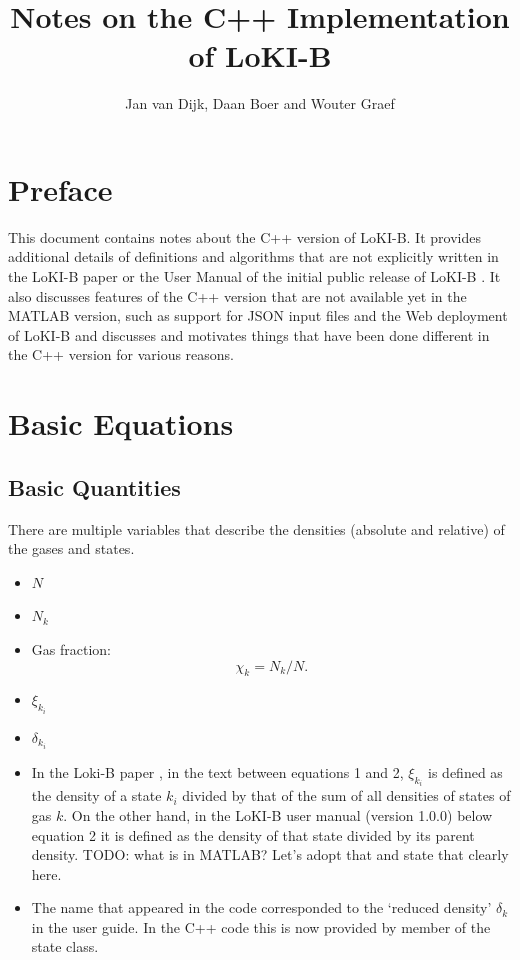 \documentclass{book}
\title{Notes on the C++ Implementation of LoKI-B}
\author{Jan van Dijk, Daan Boer and Wouter Graef}
\begin{document}
\maketitle

\chapter*{Preface}

This document contains notes about the C++ version of LoKI-B.
It provides additional details of definitions and algorithms that are not
explicitly written in the LoKI-B paper \cite{Tejero2019} or the User Manual
of the initial public release of LoKI-B \cite{Manual_1_0_0}. It also
discusses features of the C++ version that are not available yet in the MATLAB
version, such as support for JSON input files and the Web deployment of LoKI-B
and discusses and motivates things that have been done different in the C++
version for various reasons.

\tableofcontents

\chapter{Basic Equations}

\section{Basic Quantities}

There are multiple variables that describe the densities (absolute and relative)
of the gases and states.
\begin{itemize}
  \item $N$
  \item $N_k$
  \item Gas fraction:
  \begin{equation}
    \chi_k = N_k/N.
    \label{eq:chi_k}
  \end{equation}
  \item $\xi_{k_i}$
  \item $\delta_{k_i}$
\end{itemize}

\begin{itemize}
  \item In the Loki-B paper \cite{Tejero2019}, in the text between equations 1
  and 2, $\xi_{k_i}$ is defined as the density of a state $k_i$ divided by that
  of the sum of all densities of states of gas $k$. On the other hand, in the
  LoKI-B user manual (version 1.0.0) \cite{Manual_1_0_0} below equation 2 it
  is defined as the density of that state divided by its parent density.
  TODO: what is in MATLAB? Let's adopt that and state that clearly here.
  \item The name  that appeared in the code corresponded to the
  `reduced density' $\delta_{k}$ in the user guide. In the C++ code this is
  now provided by member  of the state class.
\end{itemize}
\end{document}
